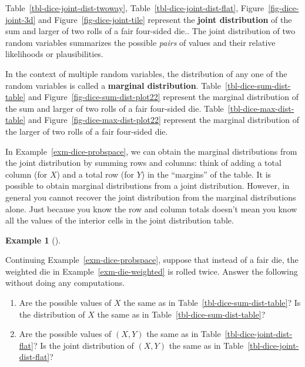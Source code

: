 \documentclass[
  letterpaper,
  DIV=11,
  numbers=noendperiod]{scrreprt}
\providecommand{\tightlist}{%
  \setlength{\itemsep}{0pt}\setlength{\parskip}{0pt}}
\theoremstyle{plain}
\theoremstyle{definition}
\newtheorem{example}{Example}[chapter]
\theoremstyle{definition}
\theoremstyle{definition}
\theoremstyle{remark}
\begin{document}
Table~\ref{tbl-dice-joint-dist-twoway},
Table~\ref{tbl-dice-joint-dist-flat}, Figure~\ref{fig-dice-joint-3d} and
Figure~\ref{fig-dice-joint-tile} represent the \textbf{joint
distribution} of the sum and larger of two rolls of a fair four-sided
die.. The joint distribution of two random variables summarizes the
possible \emph{pairs} of values and their relative likelihoods or
plausibilities.

In the context of multiple random variables, the distribution of any one
of the random variables is called a \textbf{marginal distribution}.
Table~\ref{tbl-dice-sum-dist-table} and
Figure~\ref{fig-dice-sum-dist-plot22} represent the marginal
distribution of the sum and larger of two rolls of a fair four-sided
die. Table~\ref{tbl-dice-max-dist-table} and
Figure~\ref{fig-dice-max-dist-plot22} represent the marginal
distribution of the larger of two rolls of a fair four-sided die.

In Example~\ref{exm-dice-probspace}, we can obtain the marginal
distributions from the joint distribution by summing rows and columns:
think of adding a total column (for \(X\)) and a total row (for \(Y\))
in the ``margins'' of the table. It is possible to obtain marginal
distributions from a joint distribution. However, in general you cannot
recover the joint distribution from the marginal distributions alone.
Just because you know the row and column totals doesn't mean you know
all the values of the interior cells in the joint distribution table.

\begin{tcolorbox}[enhanced jigsaw, opacityback=0, left=2mm, colframe=quarto-callout-note-color-frame, toprule=.15mm, breakable, colback=white, leftrule=.75mm, arc=.35mm, rightrule=.15mm, bottomrule=.15mm]

\begin{example}[]\protect\hypertarget{exm-dice-change-dist}{}\label{exm-dice-change-dist}

Continuing Example~\ref{exm-dice-probspace}, suppose that instead of a
fair die, the weighted die in Example~\ref{exm-die-weighted} is rolled
twice. Answer the following without doing any computations.

\begin{enumerate}
\def\labelenumi{\arabic{enumi}.}
\tightlist
\item
  Are the possible values of \(X\) the same as in
  Table~\ref{tbl-dice-sum-dist-table}? Is the distribution of \(X\) the
  same as in Table~\ref{tbl-dice-sum-dist-table}?
\item
  Are the possible values of \((X, Y)\) the same as in
  Table~\ref{tbl-dice-joint-dist-flat}? Is the joint distribution of
  \((X, Y)\) the same as in Table~\ref{tbl-dice-joint-dist-flat}?
\end{enumerate}

\end{example}

\end{tcolorbox}
\end{document}
